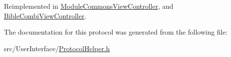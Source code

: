 Reimplemented in \hyperlink{interface_module_commons_view_controller_a20e0066c6ffdb151067053c9e5b00129}{Module\-Commons\-View\-Controller}, and \hyperlink{interface_bible_combi_view_controller_a20e0066c6ffdb151067053c9e5b00129}{Bible\-Combi\-View\-Controller}.



The documentation for this protocol was generated from the following file\-:\begin{DoxyCompactItemize}
\item 
src/\-User\-Interface/\hyperlink{_protocol_helper_8h}{Protocol\-Helper.\-h}\end{DoxyCompactItemize}
